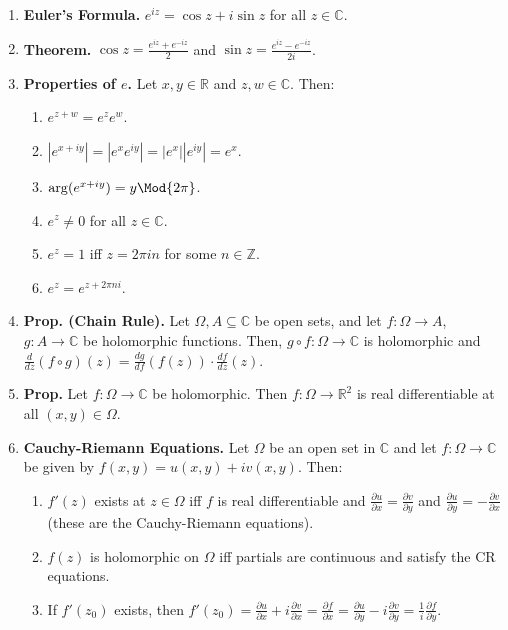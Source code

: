 \begin{enumerate}
    \item \textbf{Euler's Formula. } $e^{iz} = \cos z + i\sin z$ for all $z \in \mathbb{C}$. 
    \item \textbf{Theorem. } $\cos z = \frac{e^{iz} + e^{-iz}}{2}$ and $\sin z = \frac{e^{iz} - e^{-iz}}{2i}$. 
    \item \textbf{Properties of $e$. } Let $x,y \in \mathbb{R}$ and $z,w \in \mathbb{C}$. Then: 
    \begin{enumerate}
        \item $e^{z + w} = e^ze^w$. 
        \item $|e^{x + iy}| = |e^xe^{iy}| = |e^x||e^{iy}| = e^x$. 
        \item $\arg(e^{x + iy}) = y \Mod{2\pi}$. 
        \item $e^z \neq 0$ for all $z \in \mathbb{C}$. 
        \item $e^z = 1$ iff $z = 2\pi in$ for some $n \in \mathbb{Z}$. 
        \item $e^z = e^{z + 2\pi ni}$. 
    \end{enumerate} 
    \item \textbf{Prop. (Chain Rule). } Let $\Omega, A \subseteq \mathbb{C}$ be open sets, and let $f: \Omega \to A$, $g: A \to \mathbb{C}$ be holomorphic functions. Then, $g \circ f: \Omega \to \mathbb{C}$ is holomorphic and $\frac{d}{dz}(f \circ g)(z) = \frac{dg}{df}(f(z)) \cdot \frac{df}{dz}(z)$. 
    \item \textbf{Prop. } Let $f: \Omega \to \mathbb{C}$ be holomorphic. Then $f: \Omega \to \mathbb{R}^2$ is real differentiable at all $(x,y) \in \Omega$. 
    \item \textbf{Cauchy-Riemann Equations. } Let $\Omega$ be an open set in $\mathbb{C}$ and let $f: \Omega \to \mathbb{C}$ be given by $f(x,y) = u(x,y) + iv(x,y)$. Then: 
    \begin{enumerate}
        \item $f'(z)$ exists at $z \in \Omega$ iff $f$ is real differentiable and $\frac{\partial u}{\partial x} = \frac{\partial v}{\partial y}$ and $\frac{\partial u}{\partial y} = -\frac{\partial v}{\partial x}$ (these are the Cauchy-Riemann equations). 
        \item $f(z)$ is holomorphic on $\Omega$ iff partials are continuous and satisfy the CR equations. 
        \item If $f'(z_0)$ exists, then $f'(z_0) = \frac{\partial u}{\partial x} + i\frac{\partial v}{\partial x} = \frac{\partial f}{\partial x} = \frac{\partial u}{\partial y} - i\frac{\partial v}{\partial y} = \frac{1}{i}\frac{\partial f}{\partial y}$. 

\end{enumerate}
\end{enumerate}
